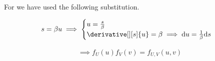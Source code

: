 \begin{solution}
\begin{enumerate}[label = (\alph*)]
    For \Quote{$!$} we have used the following substitution.

    \begin{align*}
        s = \beta u
        \implies
        \begin{cases}
            u = \frac{s}{\beta} \\
            \derivative[][s]{u} = \beta \implies \mathrm d u = \frac{1}{\beta} \mathrm d s
        \end{cases}
    \end{align*}

    \begin{align*}
        \implies
        f_U(u) f_V(v) = f_{U, V}(u, v)        
    \end{align*}

\end{enumerate}

\end{solution}

